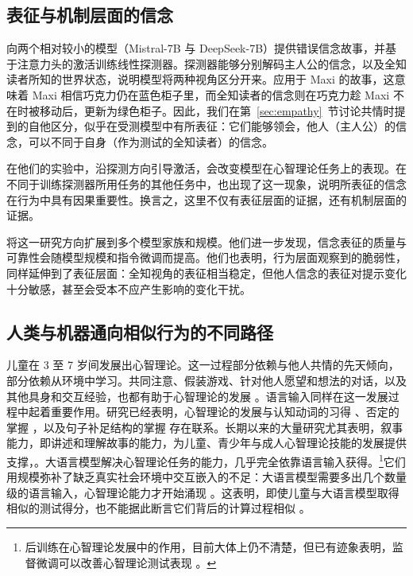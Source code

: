 \subsection{表征与机制层面的信念}
\citet{zhu2024language} 向两个相对较小的模型（Mistral-7B 与 DeepSeek-7B）提供错误信念故事，并基于注意力头的激活训练线性探测器。探测器能够分别解码主人公的信念，以及全知读者所知的世界状态，说明模型将两种视角区分开来。应用于 Maxi 的故事，这意味着 Maxi 相信巧克力仍在蓝色柜子里，而全知读者的信念则在巧克力趁 Maxi 不在时被移动后，更新为绿色柜子。因此，我们在第~\ref{sec:empathy}~节讨论共情时提到的自他区分，似乎在受测模型中有所表征：它们能够领会，他人（主人公）的信念，可以不同于自身（作为测试的全知读者）的信念。

在他们的实验中，沿探测方向引导激活，会改变模型在心智理论任务上的表现。在不同于训练探测器所用任务的其他任务中，也出现了这一现象，说明所表征的信念在行为中具有因果重要性。换言之，这里不仅有表征层面的证据，还有机制层面的证据。

\citet{bortoletto2024benchmarking} 将这一研究方向扩展到多个模型家族和规模。他们进一步发现，信念表征的质量与可靠性会随模型规模和指令微调而提高。他们也表明，行为层面观察到的脆弱性，同样延伸到了表征层面：全知视角的表征相当稳定，但他人信念的表征对提示变化十分敏感，甚至会受本不应产生影响的变化干扰。

\subsection{人类与机器通向相似行为的不同路径}
儿童在 3 至 7 岁间发展出心智理论。这一过程部分依赖与他人共情的先天倾向，部分依赖从环境中学习。共同注意、假装游戏、针对他人愿望和想法的对话，以及其他具身和交互经验，也都有助于心智理论的发展 \citep{apperly2011mindreaders}。语言输入同样在这一发展过程中起着重要作用。研究已经表明，心智理论的发展与认知动词的习得 \citep{milligan2007language}、否定的掌握 \citep{devilliers2014role}，以及句子补足结构的掌握 \citep{lohmann2003role} 存在联系。长期以来的大量研究尤其表明，叙事能力，即讲述和理解故事的能力，为儿童、青少年与成人心智理论技能的发展提供支撑，\citep[例如]{hutto2008folk, vanduijn2016, nicolopoulou2017narrativity}。大语言模型解决心智理论任务的能力，几乎完全依靠语言输入获得。\footnote{后训练在心智理论发展中的作用，目前大体上仍不清楚，但已有迹象表明，监督微调可以改善心智理论测试表现 \citep{kouwenhoven2026traces}。}它们用规模弥补了缺乏真实社会环境中交互嵌入的不足：大语言模型需要多出几个数量级的语言输入，心智理论能力才开始涌现 \citep{trott2023do, kouwenhoven2026traces}。这表明，即使儿童与大语言模型取得相似的测试得分，也不能据此断言它们背后的计算过程相似 \citep{hu2025reevaluatingtheorymindevaluation}。

